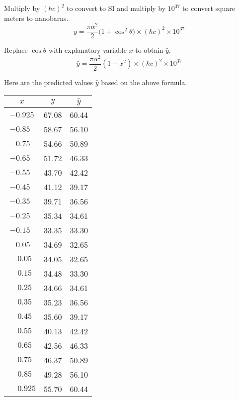 \documentclass[12pt]{article}
\begin{document}
Multiply by $(\hbar c)^2$ to convert to SI
and multiply by $10^{37}$ to convert square meters to nanobarns.
\begin{equation*}
y=\frac{\pi\alpha^2}{2}\big(1+\cos^2\theta\big)\times(\hbar c)^2\times10^{37}
\end{equation*}

Replace $\cos\theta$ with explanatory variable $x$ to obtain $\hat{y}$.
\begin{equation*}
\hat{y}=\frac{\pi\alpha^2}{2}\left(1+x^2\right)\times(\hbar c)^2\times10^{37}
\end{equation*}

Here are the predicted values $\hat{y}$ based on the above formula.

\begin{center}
\begin{tabular}{|c|c|c|}
\hline
$x$ & $y$ & $\hat{y}$ \\
\hline
$-0.925$ & 67.08 & 60.44\\
$-0.85\phantom{0}$ & 58.67 & 56.10\\
$-0.75\phantom{0}$ & 54.66 & 50.89\\
$-0.65\phantom{0}$ & 51.72 & 46.33\\
$-0.55\phantom{0}$ & 43.70 & 42.42\\
$-0.45\phantom{0}$ & 41.12 & 39.17\\
$-0.35\phantom{0}$ & 39.71 & 36.56\\
$-0.25\phantom{0}$ & 35.34 & 34.61\\
$-0.15\phantom{0}$ & 33.35 & 33.30\\
$-0.05\phantom{0}$ & 34.69 & 32.65\\
$\phantom{+}0.05\phantom{0}$ & 34.05 & 32.65\\
$\phantom{+}0.15\phantom{0}$ & 34.48 & 33.30\\
$\phantom{+}0.25\phantom{0}$ & 34.66 & 34.61\\
$\phantom{+}0.35\phantom{0}$ & 35.23 & 36.56\\
$\phantom{+}0.45\phantom{0}$ & 35.60 & 39.17\\
$\phantom{+}0.55\phantom{0}$ & 40.13 & 42.42\\
$\phantom{+}0.65\phantom{0}$ & 42.56 & 46.33\\
$\phantom{+}0.75\phantom{0}$ & 46.37 & 50.89\\
$\phantom{+}0.85\phantom{0}$ & 49.28 & 56.10\\
$\phantom{+}0.925$ & 55.70 & 60.44\\
\hline
\end{tabular}
\end{center}
\end{document}
